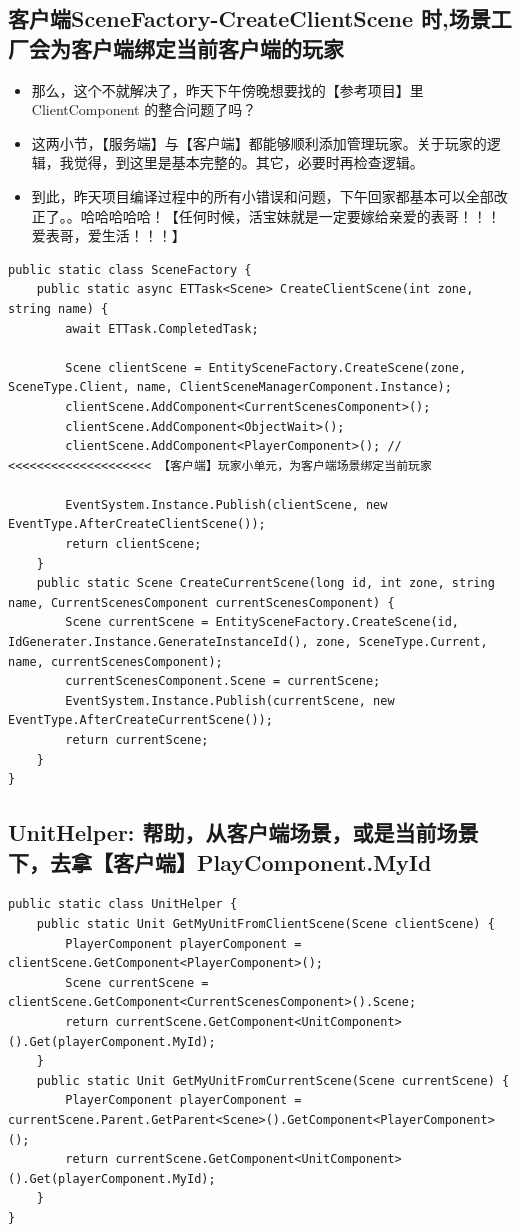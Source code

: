 \documentclass[9pt, b5paper]{article}
\begin{document}
\subsection{客户端SceneFactory-CreateClientScene 时,场景工厂会为客户端绑定当前客户端的玩家}
\label{sec-9-8}
\begin{itemize}
\item 那么，这个不就解决了，昨天下午傍晚想要找的【参考项目】里 ClientComponent 的整合问题了吗？
\item 这两小节，【服务端】与【客户端】都能够顺利添加管理玩家。关于玩家的逻辑，我觉得，到这里是基本完整的。其它，必要时再检查逻辑。
\item 到此，昨天项目编译过程中的所有小错误和问题，下午回家都基本可以全部改正了。。哈哈哈哈哈！【任何时候，活宝妹就是一定要嫁给亲爱的表哥！！！爱表哥，爱生活！！！】
\end{itemize}
\begin{verbatim}
public static class SceneFactory {
    public static async ETTask<Scene> CreateClientScene(int zone, string name) {
        await ETTask.CompletedTask;

        Scene clientScene = EntitySceneFactory.CreateScene(zone, SceneType.Client, name, ClientSceneManagerComponent.Instance);
        clientScene.AddComponent<CurrentScenesComponent>();
        clientScene.AddComponent<ObjectWait>();
        clientScene.AddComponent<PlayerComponent>(); // <<<<<<<<<<<<<<<<<<<< 【客户端】玩家小单元，为客户端场景绑定当前玩家 

        EventSystem.Instance.Publish(clientScene, new EventType.AfterCreateClientScene()); 
        return clientScene;
    }
    public static Scene CreateCurrentScene(long id, int zone, string name, CurrentScenesComponent currentScenesComponent) {
        Scene currentScene = EntitySceneFactory.CreateScene(id, IdGenerater.Instance.GenerateInstanceId(), zone, SceneType.Current, name, currentScenesComponent);
        currentScenesComponent.Scene = currentScene;
        EventSystem.Instance.Publish(currentScene, new EventType.AfterCreateCurrentScene());
        return currentScene;
    }
}
\end{verbatim}
\subsection{UnitHelper: 帮助，从客户端场景，或是当前场景下，去拿【客户端】PlayComponent.MyId}
\label{sec-9-9}
\begin{verbatim}
public static class UnitHelper {
    public static Unit GetMyUnitFromClientScene(Scene clientScene) {
        PlayerComponent playerComponent = clientScene.GetComponent<PlayerComponent>();
        Scene currentScene = clientScene.GetComponent<CurrentScenesComponent>().Scene;
        return currentScene.GetComponent<UnitComponent>().Get(playerComponent.MyId);
    }
    public static Unit GetMyUnitFromCurrentScene(Scene currentScene) {
        PlayerComponent playerComponent = currentScene.Parent.GetParent<Scene>().GetComponent<PlayerComponent>();
        return currentScene.GetComponent<UnitComponent>().Get(playerComponent.MyId);
    }
}
\end{verbatim}
\end{document}

